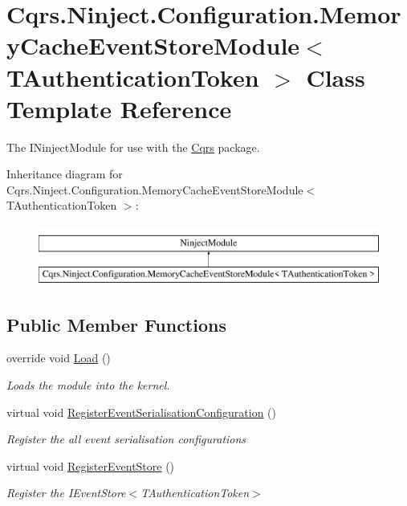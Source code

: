 \hypertarget{classCqrs_1_1Ninject_1_1Configuration_1_1MemoryCacheEventStoreModule}{}\section{Cqrs.\+Ninject.\+Configuration.\+Memory\+Cache\+Event\+Store\+Module$<$ T\+Authentication\+Token $>$ Class Template Reference}
\label{classCqrs_1_1Ninject_1_1Configuration_1_1MemoryCacheEventStoreModule}


The I\+Ninject\+Module for use with the \hyperlink{namespaceCqrs}{Cqrs} package.  


Inheritance diagram for Cqrs.\+Ninject.\+Configuration.\+Memory\+Cache\+Event\+Store\+Module$<$ T\+Authentication\+Token $>$\+:\begin{figure}[H]
\begin{center}
\leavevmode
\includegraphics[height=2.000000cm]{classCqrs_1_1Ninject_1_1Configuration_1_1MemoryCacheEventStoreModule}
\end{center}
\end{figure}
\subsection*{Public Member Functions}
\begin{DoxyCompactItemize}
\item 
override void \hyperlink{classCqrs_1_1Ninject_1_1Configuration_1_1MemoryCacheEventStoreModule_a351093c6c6f864c24970b106939fad20_a351093c6c6f864c24970b106939fad20}{Load} ()
\begin{DoxyCompactList}\small\item\em Loads the module into the kernel. \end{DoxyCompactList}\item 
virtual void \hyperlink{classCqrs_1_1Ninject_1_1Configuration_1_1MemoryCacheEventStoreModule_a0872590a8f8738e6f11a9d39274ff691_a0872590a8f8738e6f11a9d39274ff691}{Register\+Event\+Serialisation\+Configuration} ()
\begin{DoxyCompactList}\small\item\em Register the all event serialisation configurations \end{DoxyCompactList}\item 
virtual void \hyperlink{classCqrs_1_1Ninject_1_1Configuration_1_1MemoryCacheEventStoreModule_a085e95adbb290708cb8912c82605782c_a085e95adbb290708cb8912c82605782c}{Register\+Event\+Store} ()
\begin{DoxyCompactList}\small\item\em Register the I\+Event\+Store$<$\+T\+Authentication\+Token$>$ \end{DoxyCompactList}\end{DoxyCompactItemize}


